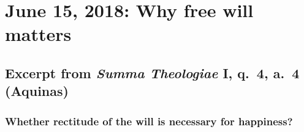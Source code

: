 \documentclass[10pt,article,twoside]{memoir}
\begin{document}
	\pagestyle{mystyle}
%	
	\chapter{June 15, 2018: Why free will matters}
	\begin{multicols}{2}
	\section{Excerpt from \emph{Summa Theologiae} I, q.~4, a.~4 (Aquinas)}
	\subsection{Whether rectitude of the will is necessary for happiness?}
	

\end{multicols}
\end{document}
